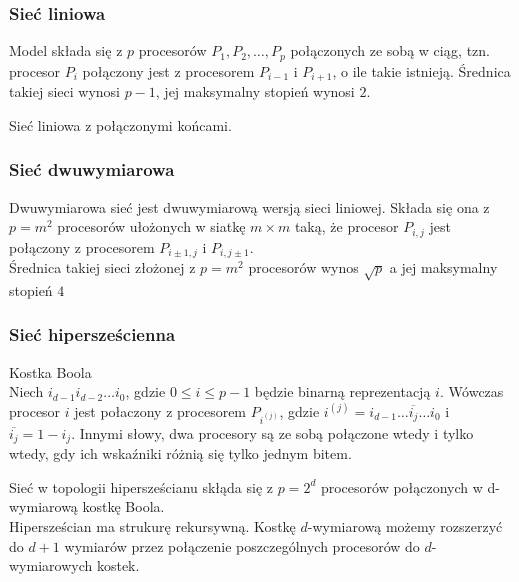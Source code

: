 \subsubsection{Sieć liniowa}
\begin{definicja}
Model składa się z \(p\) procesorów \(P_1, P_2, \dots, P_p\) połączonych ze sobą w ciąg, tzn. procesor \(P_i\) połączony jest z procesorem \(P_{i-1}\) i \(P_{i+1}\), o ile takie istnieją. Średnica takiej sieci wynosi \(p-1\), jej maksymalny stopień wynosi \(2\).\\
\end{definicja}
\begin{definicja}[Torus]
Sieć liniowa z połączonymi końcami.
\end{definicja}


\subsubsection{Sieć dwuwymiarowa}

Dwuwymiarowa sieć jest dwuwymiarową wersją sieci liniowej. Składa się ona z \(p=m^2\) procesorów ułożonych w siatkę \(m\times m\) taką, że procesor \(P_{i,j}\) jest połączony z procesorem \(P_{i\pm 1, j}\) i \(P_{i, j\pm 1}\).\\
Średnica takiej sieci złożonej z \(p=m^2\) procesorów wynos \(\sqrt{p}\) a jej maksymalny stopień \(4\)


\subsubsection{Sieć hipersześcienna}

\begin{definicja}{Kostka Boola}\\
Niech \(i_{d-1}i_{d-2}\dots i_{0}\), gdzie \(0\leq i \leq p-1\) będzie binarną reprezentacją \(i\). Wówczas procesor \({i}\) jest połaczony z procesorem \(P_{i^(j)}\), gdzie \(i^{(j)}=i_{d-1}\dots \overline{i_j} \dots i_0\) i \(\overline{i_j} = 1 - i_j\). Innymi słowy, dwa procesory są ze sobą połączone wtedy i tylko wtedy, gdy ich wskaźniki różnią się tylko jednym bitem.\\
\end{definicja}

Sieć w topologii hipersześcianu skłąda się z \(p=2^d\) procesorów połączonych w d-wymiarową kostkę Boola.\\

Hipersześcian ma strukurę rekursywną. Kostkę \(d\)-wymiarową możemy rozszerzyć do \(d+1\) wymiarów przez połączenie poszczególnych procesorów do \(d\)-wymiarowych kostek.\\

